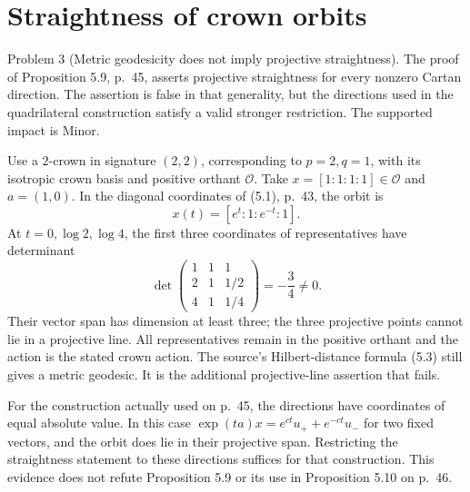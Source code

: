 \documentclass[10pt]{article}
\begin{document}
\section*{Straightness of crown orbits}
Problem 3 (Metric geodesicity does not imply projective straightness).  The proof of Proposition 5.9, p. 45, asserts projective straightness for every nonzero Cartan direction. The assertion is false in that generality, but the directions used in the quadrilateral construction satisfy a valid stronger restriction. The supported impact is Minor.\par
Use a \(2\)-crown in signature \((2,2)\), corresponding to \(p=2,q=1\), with its isotropic crown basis and positive orthant \(\mathcal O\). Take \(x=[1:1:1:1]\in\mathcal O\) and \(a=(1,0)\). In the diagonal coordinates of (5.1), p. 43, the orbit is \[x(t)=[e^t:1:e^{-t}:1].\] At \(t=0,\log2,\log4\), the first three coordinates of representatives have determinant \[\det\begin{pmatrix}1&1&1\\2&1&1/2\\4&1&1/4\end{pmatrix}
 =-\frac34\ne0.\] Their vector span has dimension at least three; the three projective points cannot lie in a projective line. All representatives remain in the positive orthant and the action is the stated crown action. The source’s Hilbert-distance formula (5.3) still gives a metric geodesic. It is the additional projective-line assertion that fails.\par
For the construction actually used on p. 45, the directions have coordinates of equal absolute value. In this case \(\exp(ta)x=e^{ct}u_++e^{-ct}u_-\) for two fixed vectors, and the orbit does lie in their projective span. Restricting the straightness statement to these directions suffices for that construction. This evidence does not refute Proposition 5.9 or its use in Proposition 5.10 on p. 46.\par
\end{document}
